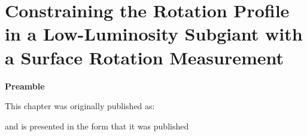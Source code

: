 \let\cleardoublepage=\clearpage

\chapter{Constraining the Rotation Profile in a Low-Luminosity Subgiant with a Surface Rotation Measurement}
\label{chap:subgiant_ast}



\textbf{Preamble}

This chapter was originally published as:
\begin{quote}
	\citet{tanner_ast}
\end{quote}
and is presented in the form that it was published 








